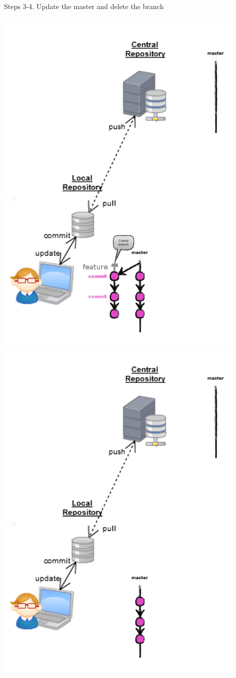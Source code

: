 \begin{frame}[fragile]{Steps 3-4. Update the master and delete the branch}
\begin{columns}
\begin{column}{0.4\textwidth}
\begin{center}
{			}\only<2> {
				\includegraphics[width=0.9\textwidth]{branch_rebase.png}
			}\only<3> {
				\includegraphics[width=0.9\textwidth]{branch_delete.png}
}
\end{center}
\end{column}
\end{columns}
\end{frame}
